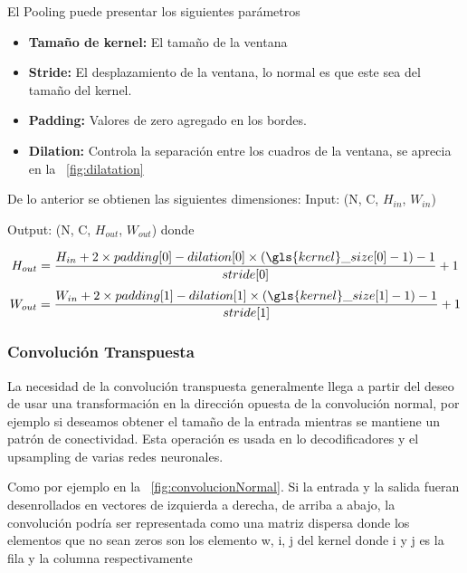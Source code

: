 El \gls{Pooling} puede presentar los siguientes parámetros 
\begin{itemize}
    \item  \textbf{Tamaño de \gls{kernel}:} El tamaño de la ventana

    \item    \textbf{Stride:} El desplazamiento de la ventana, lo normal es que este sea del tamaño del \gls{kernel}.

    \item    \textbf{Padding:} Valores de zero agregado en los bordes.

    \item    \textbf{Dilation:} Controla la separación entre los cuadros de la ventana, se aprecia en la \figurename~\ref{fig:dilatation}
    
\end{itemize}{}

        


De lo anterior se obtienen las siguientes dimensiones:
        Input: (N, C, $H_{in}$, $W_{in}$)
        
        Output: (N, C, $H_{out}$, $W_{out}$) donde
        
        
        \begin{equation}
         H_{out}= \frac{H_{in}+2\times padding[0]-dilation[0]\times (\gls{kernel}\_size[0]-1)-1}{stride[0]} +1  
        \end{equation}
        \begin{equation}
         W_{out}= \frac{W_{in}+2\times padding[1]-dilation[1]\times (\gls{kernel}\_size[1]-1)-1}{stride[1]} +1  
        \end{equation}
        



\subsubsection{Convolución Transpuesta}
\label{sub:convolucionTranspuesta}
La necesidad de la convolución transpuesta generalmente llega a partir del deseo de usar una transformación en la dirección opuesta de la convolución normal, por ejemplo si deseamos obtener el tamaño de la entrada mientras se mantiene un patrón de conectividad. Esta operación es usada en lo decodificadores y el upsampling de varias redes neuronales.

Como por ejemplo en la \figurename~\ref{fig:convolucionNormal}. Si la entrada y la salida fueran desenrollados en vectores de izquierda a derecha, de arriba a abajo, la convolución podría ser representada como una matriz dispersa donde los elementos que no sean zeros son los elemento w, i, j del \gls{kernel} donde i y j es la fila y la columna respectivamente

